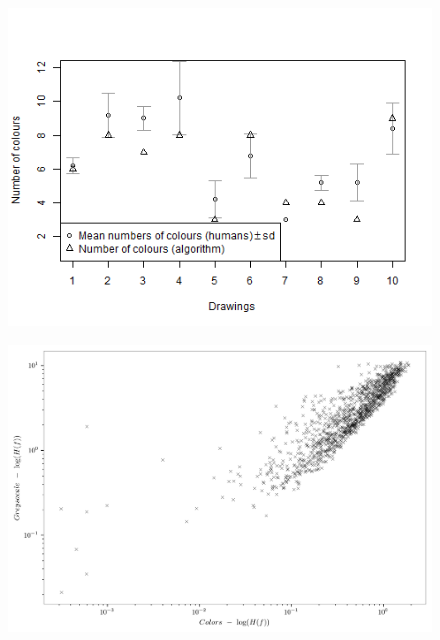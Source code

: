 \documentclass[11pt,a4paper]{article}
\begin{document}
\begin{figure}[h!]
	\centering
	\includegraphics[width=\linewidth]{figures/comp_nb_colours_sd.png}
	\caption{ }
	\label{}
\end{figure}

\begin{figure}[h!]
	\centering
	\includegraphics[width=\linewidth]{figures/colors-greysacale-entropies.png}
	\caption{ }
	\label{}
\end{figure}

		
		
\end{document}
